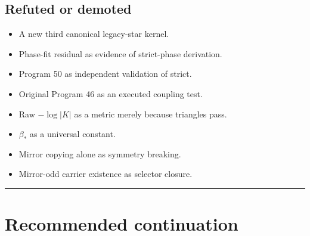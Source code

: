 \documentclass[11pt,a4paper,openany]{report}
\begin{document}
\section{Refuted or demoted}

\begin{itemize}
\item 
A new third canonical legacy-star kernel.

\item 
Phase-fit residual as evidence of strict-phase derivation.

\item 
Program 50 as independent validation of strict.

\item 
Original Program 46 as an executed coupling test.

\item 
Raw \(-\log|K|\) as a metric merely because triangles pass.

\item 
\(\beta_*\) as a universal constant.

\item 
Mirror copying alone as symmetry breaking.

\item 
Mirror-odd carrier existence as selector closure.

\end{itemize}

\par\medskip\hrule\medskip

\chapter{Recommended continuation}
\end{document}
